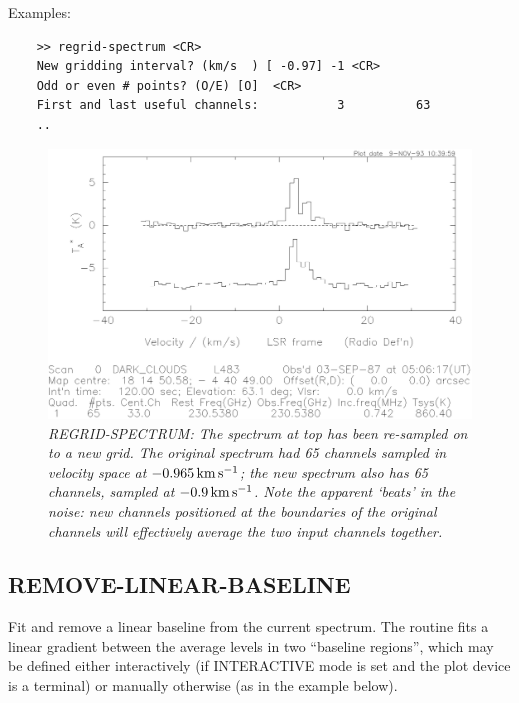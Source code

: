 \documentclass[11pt,twoside]{report}
\newcommand{\kms}{{\rm\,km\,s^{-1}}}
\begin{document}
Examples:
\begin{verbatim}
    >> regrid-spectrum <CR>
    New gridding interval? (km/s  ) [ -0.97] -1 <CR>
    Odd or even # points? (O/E) [O]  <CR>
    First and last useful channels:           3          63
    ..
\end{verbatim}

\begin{figure}[htbp]
\begin{center}
\includegraphics[scale=0.65]{regrid.ps}
\protect\parbox{5.5in}
{\caption[REGRID]
{\sl
REGRID-SPECTRUM: The spectrum at top has been re-sampled on to a new grid. The
original spectrum had 65 channels sampled in velocity space at $-0.965 \kms$;
the new spectrum also has 65 channels, sampled at $-0.9\kms$. Note the
apparent `beats' in the noise: new channels positioned at the boundaries of
the original channels will effectively average the two input channels together.
\label{REGRID}
}
}
\end{center}
\end{figure}

\subsection{REMOVE-LINEAR-BASELINE} 

Fit and remove a linear baseline from the current spectrum. The routine
fits a linear gradient between the average levels in two ``baseline regions'',
which may be defined either interactively (if INTERACTIVE mode is set and the
plot device is a terminal) or manually otherwise (as in the example below).
\end{document}
